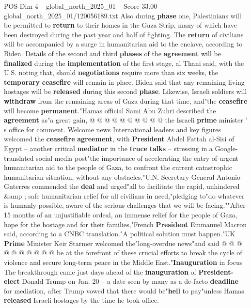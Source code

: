 \begin{textsample}{POS Dim 4 – global\_north\_2025\_01 – Score 33.00 – global\_north\_2025\_01/120056189.txt}
Also during \textbf{phase} one, Palestinians will be permitted to \textbf{return} to their homes in the Gaza Strip, many of which have been destroyed during the past year and half of fighting.
The \textbf{return} of civilians will be accompanied by a surge in humanitarian aid to the enclave, according to Biden.
Details of the second and third \textbf{phases} of the \textbf{agreement} will be \textbf{finalized} during the \textbf{implementation} of the first stage, al Thani said, with the U.S. noting that, should \textbf{negotiations} require more than six weeks, the \textbf{temporary} \textbf{ceasefire} will remain in place.
Biden said that any remaining living hostages will be \textbf{released} during this second \textbf{phase}.
Likewise, Israeli soldiers will \textbf{withdraw} from the remaining areas of Gaza during that time, and"the \textbf{ceasefire} will become \textbf{permanent}."Hamas official Sami Abu Zuhri described the \textbf{agreement} as"a great gain, @ @ @ @ @ @ @ @ @ @ the Israeli \textbf{prime} minister ' s office for comment.
Welcome news International leaders and key figures welcomed the \textbf{ceasefire} \textbf{agreement}, with \textbf{President} Abdel Fattah al-Sisi of Egypt -- another critical \textbf{mediator} in the \textbf{truce} \textbf{talks} -- stressing in a Google-translated social media post"the importance of accelerating the entry of urgent humanitarian aid to the people of Gaza, to confront the current catastrophic humanitarian situation, without any obstacles."U.N.
Secretary-General Antonio Guterres commended the \textbf{deal} and urged"all to facilitate the rapid, unhindered \&amp ; safe humanitarian relief for all civilians in need,"pledging to"do whatever is humanly possible, aware of the serious challenges that we will be facing.""After 15 months of an unjustifiable ordeal, an immense relief for the people of Gaza, hope for the hostage and for their families,"French \textbf{President} Emmanuel Macron said, according to a CNBC translation."A political solution must happen."UK \textbf{Prime} Minister Keir Starmer welcomed the"long-overdue news"and said @ @ @ @ @ @ @ @ @ @ be at the forefront of these crucial efforts to break the cycle of violence and secure long-term peace in the Middle East."\textbf{Inauguration} in focus The breakthrough came just days ahead of the \textbf{inauguration} of \textbf{President-elect} Donald Trump on Jan. 20 -- a date seen by many as a de-facto \textbf{deadline} for mediation, after Trump vowed that there would be"\textbf{hell} to pay"unless Hamas \textbf{released} Israeli hostages by the time he took office.

\end{textsample}
